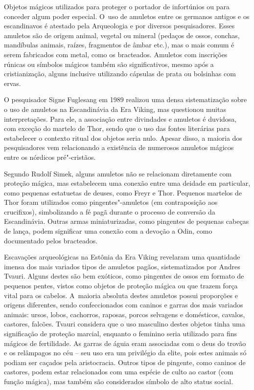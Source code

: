 Objetos mágicos utilizados para proteger o portador de infortúnios ou
para conceder algum poder especial. O~uso de amuletos entre os germanos
antigos e os escandinavos é atestado pela Arqueologia e por diversos
pesquisadores. Esses amuletos são de origem animal, vegetal ou mineral
(pedaços de ossos, conchas, mandíbulas animais, raízes, fragmentos de
âmbar etc.), mas o mais comum é serem fabricados com metal, como os
bracteados. Amuletos com inscrições rúnicas ou símbolos mágicos também
são significativos, mesmo após a cristianização, alguns inclusive
utilizando cápsulas de prata ou bolsinhas com ervas.

O pesquisador Signe Fuglesang em 1989 realizou uma densa sistematização
sobre o uso de amuletos na Escandinávia da Era Viking, mas questionou
muitas interpretações. Para ele, a associação entre divindades e
amuletos é duvidosa, com exceção do martelo de Thor, sendo que o uso das
fontes literárias para estabelecer o contexto ritual dos objetos seria
nulo. Apesar disso, a maioria dos pesquisadores vem relacionando a
existência de numerosos amuletos mágicos entre os nórdicos pré"-cristãos.

Segundo Rudolf Simek, alguns amuletos não se relacionam diretamente com
proteção mágica, mas estabelecem uma conexão entre uma deidade em
particular, como pequenas estatuetas de deuses, como Freyr e Thor.
Pequenos martelos de Thor foram utilizados como pingentes"-amuletos (em
contraposição aos crucifixos), simbolizando a fé pagã durante o processo
de conversão da Escandinávia. Outras armas miniaturizadas, como
pingentes de pequenas cabeças de lança, podem significar uma conexão com
a devoção a Odin, como documentado pelos bracteados.

Escavações arqueológicas na Estônia da Era Viking revelaram uma
quantidade imensa dos mais variados tipos de amuletos pagãos,
sistematizados por Andres Tvauri. Alguns destes são bem exóticos, como
pingentes de ossos em formato de pequenos pentes, vistos como objetos de
proteção mágica ou que trazem força vital para os cabelos. A~maioria
absoluta destes amuletos possui proporções e origens diferentes, sendo
confeccionados com caninos e garras dos mais variados animais: ursos,
lobos, cachorros, raposas, porcos selvagens e domésticos, cavalos,
castores, falcões. Tvauri considera que o uso masculino destes objetos
tinha uma significação de proteção marcial, enquanto o feminino seria
utilizado para fins mágicos de fertilidade. As garras de águia eram
associadas com o deus do trovão e os relâmpagos no céu -- seu uso era um
privilégio da elite, pois estes animais só podiam ser caçados pela
aristocracia. Outros tipos de pingente, como caninos de castores, podem
estar relacionados com uma espécie de culto ao castor (com função
mágica), mas também são considerados símbolo de alto status social.

